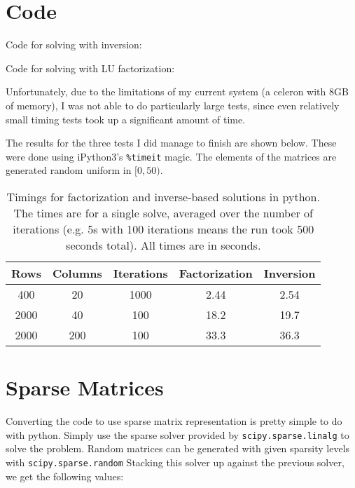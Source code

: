 \documentclass{article}
\begin{document}
\section{Code}

Code for solving with inversion:



Code for solving with LU factorization:



Unfortunately, due to the limitations of my current system (a celeron with 8GB
of memory), I was not able to do particularly large tests, since even relatively
small timing tests took up a significant amount of time.

The results for the three tests I did manage to finish are shown below. These
were done using iPython3's \texttt{\%timeit} magic. The elements of the matrices
are generated random uniform in $[0,50)$.

\begin{table}[h]
  \centering
  \begin{tabular}{|c|c|c|c|c|}
    \hline
    Rows & Columns & Iterations & Factorization & Inversion \\ \hline \hline
    400 & 20 & 1000 & 2.44 & 2.54\\ \hline
    2000 & 40 & 100 & 18.2 & 19.7\\ \hline
    2000 & 200 & 100 & 33.3 & 36.3\\ \hline
  \end{tabular}
  \caption{Timings for factorization and inverse-based solutions in python. The
    times are for a single solve, averaged over the number of iterations (e.g.
    5s with 100 iterations means the run took 500 seconds total). All times are
    in seconds.}
  \label{tab: solvecomparetimings}
\end{table}

\section{Sparse Matrices}

Converting the code to use sparse matrix representation is pretty simple to do
with python. Simply use the sparse solver provided by
\texttt{scipy.sparse.linalg} to solve the problem. Random matrices can be
generated with given sparsity levels with \texttt{scipy.sparse.random}
Stacking this solver up against the previous solver, we get the following values:
\end{document}
